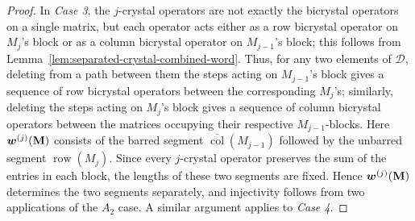\documentclass[12pt]{amsart}
\newcommand{\bs}{\boldsymbol}
\theoremstyle{definition}
\theoremstyle{remark}
\begin{document}
\begin{proof}
In \emph{Case 3}, the $j$-crystal operators are not exactly the
bicrystal operators on a single matrix, but each operator acts either
as a row bicrystal operator on $M_j$'s block or as a column bicrystal operator
on $M_{j-1}$'s block; this follows from Lemma~\ref{lem:separated-crystal-combined-word}. 
Thus, for any two elements of ${\mathcal D}$, deleting
from a path between them the steps acting on $M_{j-1}$'s block gives a
sequence of row bicrystal operators between the corresponding
$M_j$'s; similarly, deleting the steps acting on $M_j$'s block 
gives a sequence of column bicrystal operators between
the matrices occupying their respective $M_{j-1}$-blocks.
Here ${\bs w}^{(j)}({\bf M})$ consists of the barred segment
$\overline{\operatorname{col}}(M_{j-1})$ followed by the unbarred
segment $\operatorname{row}(M_j)$.
Since every $j$-crystal operator preserves the sum of the entries in
each block, the lengths of these two segments are fixed. Hence
${\bs w}^{(j)}({\bf M})$ determines the two segments separately, and
injectivity follows from two applications of the $A_2$ case. A similar argument applies to \emph{Case 4}.
\end{proof}
\end{document}
